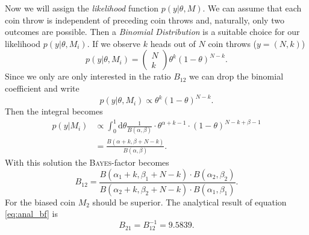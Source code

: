 \documentclass[%
 reprint,
 amsmath,amssymb,
 aps,
]{revtex4-1}
\begin{document}
Now we will assign the \emph{likelihood} function $p(y|\theta,M)$. We can assume that each coin throw is independent of preceding coin throws and, naturally, only two outcomes are possible. Then a \emph{Binomial Distribution} is a suitable choice for our likelihood $p(y|\theta,M_i)$. If we observe $k$ heads out of $N$ coin throws ($y=(N,k)$) $$p(y|\theta,M_i)=\begin{pmatrix}N\\k
\end{pmatrix}\theta^k(1-\theta)^{N-k}.$$
Since we only are only interested in the ratio $B_{12}$ we can drop the binomial coefficient and write $$p(y|\theta, M_i)\propto \theta^k(1-\theta)^{N-k}.$$
Then the integral becomes \cite{PyMC3_BF}
\begin{align*}
	p(y|M_i)&\propto \int_{0}^{1} \text{d}\theta \frac{1}{B(\alpha,\beta)} \cdot \theta^{\alpha+k-1}\cdot (1-\theta)^{N-k+\beta-1}\\
	&=\frac{B(\alpha+k,\beta+N-k)}{B(\alpha, \beta)}.
\end{align*}
With this solution the \textsc{Bayes}-factor becomes
\begin{equation}\label{eq:anal_bf}
	B_{12}=\frac{B(\alpha_1+k,\beta_1+N-k)\cdot B(\alpha_2,\beta_2)}{B(\alpha_2+k,\beta_2+N-k)\cdot B(\alpha_1,\beta_1)}.
\end{equation}
For the biased coin $M_2$ should be superior. The analytical result of equation \eqref{eq:anal_bf} is $$B_{21}=B_{12}^{-1}=9.5839.$$
\end{document}
